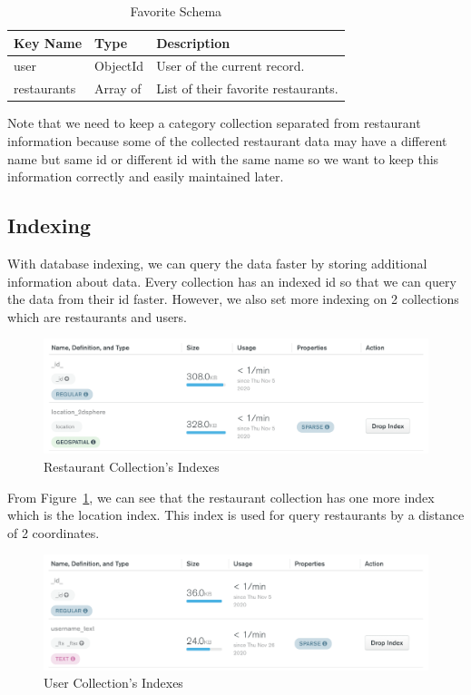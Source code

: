\documentclass[12pt,oneside,openright,a4paper]{cpe-english-project}
\begin{document}
\begin{table}[H]
\caption{Favorite Schema}\label{tbl:3FavoriteSchema}
\begin{tabularx}{\textwidth}{l|l|X} \hline\hline
Key Name & Type & Description \\ \hline\hline
user & ObjectId & User of the current record. \\ \hline
restaurants & Array of & List of their favorite restaurants. \\ \hline\hline
\end{tabularx}
\end{table}

Note that we need to keep a category collection separated from restaurant information because some of the collected restaurant data may have a different name but same id or different id with the same name so we want to keep this information correctly and easily maintained later.


\subsection{Indexing}

With database indexing, we can query the data faster by storing additional information about data. Every collection has an indexed id so that we can query the data from their id faster. However, we also set more indexing on 2 collections which are restaurants and users.

\begin{figure}[H]\centering
\includegraphics[width=400pt]{./images/3db_RestaurantCollectionsIndexes.png}
\caption{Restaurant Collection’s Indexes}\label{fig:3db_RestaurantCollectionsIndexes}
\end{figure}\vspace{-24pt}

From Figure~\ref{fig:3db_RestaurantCollectionsIndexes}, we can see that the restaurant collection has one more index which is the location index. This index is used for query restaurants by a distance of 2 coordinates.
\begin{figure}[H]\centering
\includegraphics[width=400pt]{./images/3db_UserCollectionsIndexes.png}
\caption{User Collection’s Indexes}\label{fig:3db_UserCollectionsIndexes}
\end{figure}\vspace{-24pt}
\end{document}
